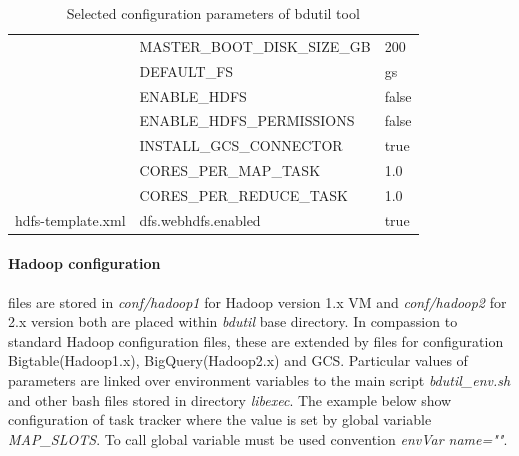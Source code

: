 \documentclass[a4paper,12pt,oneside]{report}
\begin{document}
\begin{table}[!htbp]
\begin{scriptsize}
\begin{tabular}{@{}lll@{}}
				\multicolumn{1}{|l|}{}                                 &
				\multicolumn{1}{l|}{MASTER\_BOOT\_DISK\_SIZE\_GB} & \multicolumn{1}{l|}{200}    
				\\ \cmidrule(l){2-3} 
				\multicolumn{1}{|l|}{}                                 &
				\multicolumn{1}{l|}{DEFAULT\_FS}                  & \multicolumn{1}{l|}{gs}     
				\\ \cmidrule(l){2-3} 
				\multicolumn{1}{|l|}{}                                 &
				\multicolumn{1}{l|}{ENABLE\_HDFS}                 & \multicolumn{1}{l|}{false}  
				\\ \cmidrule(l){2-3} 
				\multicolumn{1}{|l|}{}                                 &
				\multicolumn{1}{l|}{ENABLE\_HDFS\_PERMISSIONS}    & \multicolumn{1}{l|}{false}  
				\\ \cmidrule(l){2-3} 
				\multicolumn{1}{|l|}{}                                 &
				\multicolumn{1}{l|}{INSTALL\_GCS\_CONNECTOR}      & \multicolumn{1}{l|}{true}   
				\\ \cmidrule(l){2-3} 
				\multicolumn{1}{|l|}{}                                 &
				\multicolumn{1}{l|}{CORES\_PER\_MAP\_TASK}        & \multicolumn{1}{l|}{1.0}    
				\\ \cmidrule(l){2-3} 
				\multicolumn{1}{|l|}{}                                 &
				\multicolumn{1}{l|}{CORES\_PER\_REDUCE\_TASK}     & \multicolumn{1}{l|}{1.0}    
				\\ \midrule
				\multicolumn{1}{|l|}{hdfs-template.xml}                &
				\multicolumn{1}{l|}{dfs.webhdfs.enabled}          & \multicolumn{1}{l|}{true}   
				\\ \midrule
				
			\end{tabular}
			\caption{Selected configuration parameters of bdutil tool}
			\label{bdutil:config.sh}
		\end{scriptsize}
	\end{table}
	\paragraph{Hadoop configuration} files  are stored in \textit{conf/hadoop1} for
	Hadoop version 1.x VM and 
	\textit{conf/hadoop2} for 2.x version both are placed within \textit{bdutil}
	base directory. In compassion to standard Hadoop configuration files, 
	these are extended by files for configuration Bigtable(Hadoop1.x), 
	BigQuery(Hadoop2.x) and GCS. Particular values of parameters are linked over
	environment variables to   the main script \textit{bdutil\_env.sh} and other
	bash files stored in directory \textit{libexec}.  The 
	example below show configuration of task tracker where the value is set by global variable 
	\textit{MAP\_SLOTS}. To call global variable must be used convention \textit{envVar name=""}.
	
\end{document}
